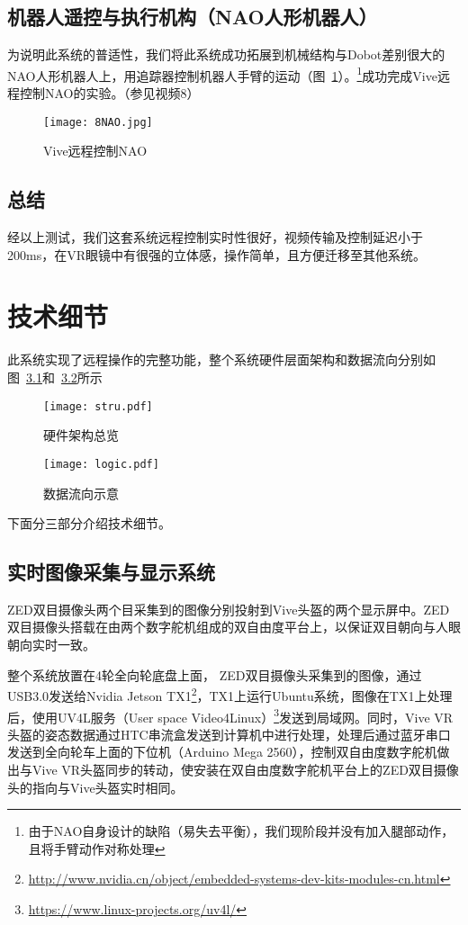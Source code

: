 \section{机器人遥控与执行机构（NAO人形机器人）}

为说明此系统的普适性，我们将此系统成功拓展到机械结构与Dobot差别很大的NAO人形机器人上，用追踪器控制机器人手臂的运动（图~\ref{8NAO}）。\footnote{由于NAO自身设计的缺陷（易失去平衡），我们现阶段并没有加入腿部动作，且将手臂动作对称处理}成功完成Vive远程控制NAO的实验。{\kaishu （参见视频8）}

\begin{figure}[htbp]
\small
\centering
\texttt{[image: 8NAO.jpg]}
\caption{Vive远程控制NAO} 
\label{8NAO}
\end{figure}


\section{总结}

经以上测试，我们这套系统远程控制实时性很好，视频传输及控制延迟小于200ms，在VR眼镜中有很强的立体感，操作简单，且方便迁移至其他系统。



\chapter{技术细节}

此系统实现了远程操作的完整功能，整个系统硬件层面架构和数据流向分别如图~\ref{stru}和~\ref{logic}所示

\begin{figure}[htbp]
\small
\centering
\texttt{[image: stru.pdf]}
\caption{硬件架构总览} 
\label{stru}
\end{figure}

\begin{figure}[htbp]
\small
\centering
\texttt{[image: logic.pdf]}
\caption{数据流向示意} 
\label{logic}
\end{figure}

下面分三部分介绍技术细节。

\section{实时图像采集与显示系统}
ZED双目摄像头两个目采集到的图像分别投射到Vive头盔的两个显示屏中。ZED双目摄像头搭载在由两个数字舵机组成的双自由度平台上，以保证双目朝向与人眼朝向实时一致。

整个系统放置在4轮全向轮底盘上面， ZED双目摄像头采集到的图像，通过USB3.0发送给Nvidia Jetson TX1\footnote{\url{http://www.nvidia.cn/object/embedded-systems-dev-kits-modules-cn.html}}，TX1上运行Ubuntu系统，图像在TX1上处理后，使用UV4L服务（User space Video4Linux）\footnote{\url{https://www.linux-projects.org/uv4l/}}发送到局域网。同时，Vive VR头盔的姿态数据通过HTC串流盒发送到计算机中进行处理，处理后通过蓝牙串口发送到全向轮车上面的下位机（Arduino Mega 2560），控制双自由度数字舵机做出与Vive VR头盔同步的转动，使安装在双自由度数字舵机平台上的ZED双目摄像头的指向与Vive头盔实时相同。


